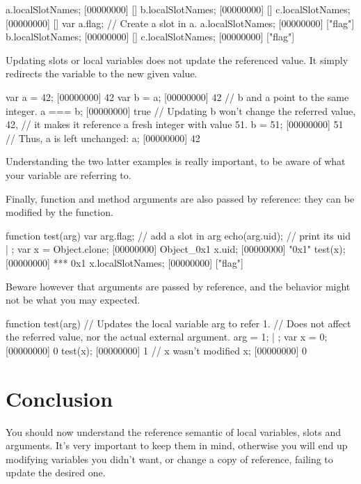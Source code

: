 \begin{urbiscript}[firstnumber=last]
a.localSlotNames;
[00000000] []
b.localSlotNames;
[00000000] []
c.localSlotNames;
[00000000] []
var a.flag; // Create a slot in a.
a.localSlotNames;
[00000000] ["flag"]
b.localSlotNames;
[00000000] []
c.localSlotNames;
[00000000] ["flag"]
\end{urbiscript}

Updating slots or local variables does not update the referenced
value. It simply redirects the variable to the new given value.

\begin{urbiscript}
var a = 42;
[00000000] 42
var b = a;
[00000000] 42
// b and a point to the same integer.
a === b;
[00000000] true
// Updating b won't change the referred value, 42,
// it makes it reference a fresh integer with value 51.
b = 51;
[00000000] 51
// Thus, a is left unchanged:
a;
[00000000] 42
\end{urbiscript}

Understanding the two latter examples is really important, to be aware
of what your variable are referring to.

Finally, function and method arguments are also passed by reference:
they can be modified by the function.

\begin{urbiscript}
function test(arg)
{
  var arg.flag;  // add a slot in arg
  echo(arg.uid); // print its uid
} | {};
var x = Object.clone;
[00000000] Object_0x1
x.uid;
[00000000] "0x1"
test(x);
[00000000] *** 0x1
x.localSlotNames;
[00000000] ["flag"]
\end{urbiscript}

Beware however that arguments are passed by reference, and the
behavior might not be what you may expected.

\begin{urbiscript}
function test(arg)
{
  // Updates the local variable arg to refer 1.
  // Does not affect the referred value, nor the actual external argument.
  arg = 1;
} | {};
var x = 0;
[00000000] 0
test(x);
[00000000] 1
// x wasn't modified
x;
[00000000] 0
\end{urbiscript}

\section{Conclusion}

You should now understand the reference semantic of local variables,
slots and arguments. It's very important to keep them in mind,
otherwise you will end up modifying variables you didn't want, or
change a copy of reference, failing to update the desired one.

